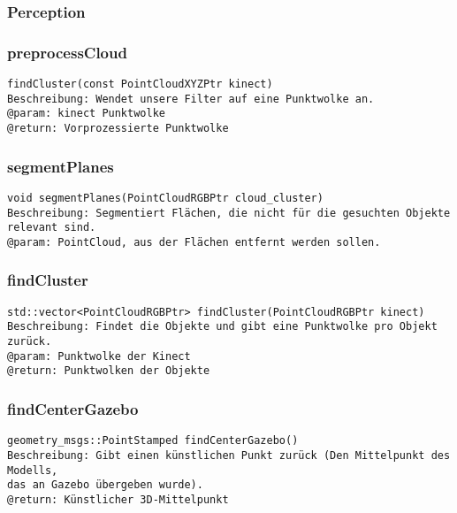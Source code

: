 \documentclass{suturo}
\begin{document}
\subsubsection*{Perception}

\subsubsection{preprocessCloud}
\begin{verbatim}
findCluster(const PointCloudXYZPtr kinect)
Beschreibung: Wendet unsere Filter auf eine Punktwolke an.
@param: kinect Punktwolke
@return: Vorprozessierte Punktwolke
\end{verbatim}\label{func:preprocesscloud}

\subsubsection{segmentPlanes}
\begin{verbatim}
void segmentPlanes(PointCloudRGBPtr cloud_cluster)
Beschreibung: Segmentiert Flächen, die nicht für die gesuchten Objekte
relevant sind.
@param: PointCloud, aus der Flächen entfernt werden sollen.
\end{verbatim}\label{func:segmentplanes}

\subsubsection{findCluster}
\begin{verbatim}
std::vector<PointCloudRGBPtr> findCluster(PointCloudRGBPtr kinect)
Beschreibung: Findet die Objekte und gibt eine Punktwolke pro Objekt zurück.
@param: Punktwolke der Kinect
@return: Punktwolken der Objekte
\end{verbatim}\label{func:findcluster}

\subsubsection{findCenterGazebo}
\begin{verbatim}
geometry_msgs::PointStamped findCenterGazebo()
Beschreibung: Gibt einen künstlichen Punkt zurück (Den Mittelpunkt des
Modells, 
das an Gazebo übergeben wurde).
@return: Künstlicher 3D-Mittelpunkt
\end{verbatim}\label{func:findcentergazebo}
\end{document}

